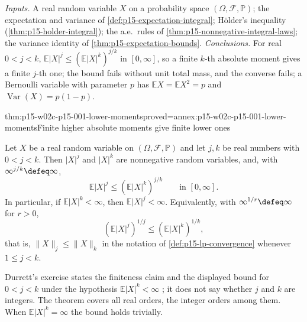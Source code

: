 \emph{Inputs.} A real random variable \(X\) on a probability space
\((\Omega,\mathcal F,\mathbb P)\); the expectation and variance of
\cref{def:p15-expectation-integral}; H\"older's inequality
(\cref{thm:p15-holder-integral}); the a.e.\ rules of
\cref{thm:p15-nonnegative-integral-laws}; the variance identity of
\cref{thm:p15-expectation-bounds}. \emph{Conclusions.} For real
\(0<j<k\), \(\mathbb E|X|^j\leq(\mathbb E|X|^k)^{j/k}\) in
\([0,\infty]\), so a finite \(k\)-th absolute moment gives a finite
\(j\)-th one; the bound fails without unit total mass, and the converse
fails; a Bernoulli variable with parameter \(p\) has
\(\mathbb EX=\mathbb EX^2=p\) and \(\operatorname{Var}(X)=p(1-p)\).

\begin{hbtheorem}{thm:p15-w02c-p15-001-lower-moments}{proved=annex:p15-w02c-p15-001-lower-moments}{Finite higher absolute moments give finite lower ones}
\par\nobreak
Let \(X\) be a real random variable on \((\Omega,\mathcal F,\mathbb P)\)
and let \(j,k\) be real numbers with \(0<j<k\). Then \(|X|^j\) and
\(|X|^k\) are nonnegative random variables, and, with
\(\infty^{j/k}\defeq\infty\),
\[
 \mathbb E|X|^j\leq\left(\mathbb E|X|^k\right)^{j/k}
 \qquad\text{in }[0,\infty].
\]
In particular, if \(\mathbb E|X|^k<\infty\), then \(\mathbb E|X|^j<\infty\).
Equivalently, with \(\infty^{1/r}\defeq\infty\) for \(r>0\),
\[
 \left(\mathbb E|X|^j\right)^{1/j}\leq\left(\mathbb E|X|^k\right)^{1/k},
\]
that is, \(\|X\|_j\leq\|X\|_k\) in the notation of
\cref{def:p15-lp-convergence} whenever \(1\leq j<k\).
\end{hbtheorem}

Durrett's exercise states the finiteness claim and the displayed bound
for \(0<j<k\) under the hypothesis \(\mathbb E|X|^k<\infty\)
\cite[exercise~1.6.11, p.~37]{DurrettPTEAuthor2019}; it does not say
whether \(j\) and \(k\) are integers. The theorem covers all real orders,
the integer orders among them. When \(\mathbb E|X|^k=\infty\) the bound
holds trivially.

